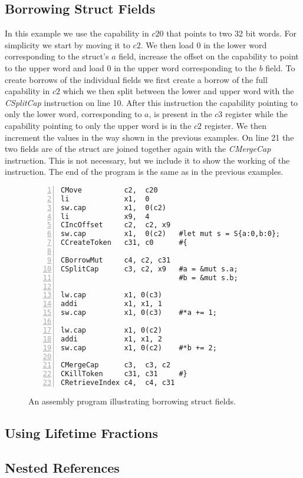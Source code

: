 \subsection{Borrowing Struct Fields}
In this example we use the capability in $c20$ that points to two 32 bit words.
For simplicity we start by moving it to $c2$.
We then load 0 in the lower word corresponding to the struct's $a$ field, increase the offset on the capability to point to the upper word and load 0 in the upper word corresponding to the $b$ field.
To create borrows of the individual fields we first create a borrow of the full capability in $c2$ which we then split between the lower and upper word with the \textit{CSplitCap} instruction on line 10.
After this instruction the capability pointing to only the lower word, corresponding to $a$, is present in the $c3$ register while the capability pointing to only the upper word is in the $c2$ register.
We then increment the values in the way shown in the previous examples.
On line 21 the two fields are of the struct are joined together again with the \textit{CMergeCap} instruction.
This is not necessary, but we include it to show the working of the instruction.
The end of the program is the same as in the previous examples.
\begin{figure}[h]
\begin{lstlisting}[style=custASM, numbers = left ,xleftmargin=1.5em]
CMove          c2,  c20
li             x1,  0
sw.cap         x1,  0(c2)
li             x9,  4
CIncOffset     c2,  c2, x9
sw.cap         x1,  0(c2)   #let mut s = S{a:0,b:0};
CCreateToken   c31, c0      #{

CBorrowMut     c4, c2, c31
CSplitCap      c3, c2, x9   #a = &mut s.a;
                            #b = &mut s.b;

lw.cap         x1, 0(c3)
addi           x1, x1, 1
sw.cap         x1, 0(c3)    #*a += 1;

lw.cap         x1, 0(c2)
addi           x1, x1, 2
sw.cap         x1, 0(c2)    #*b += 2;

CMergeCap      c3,  c3, c2
CKillToken     c31, c31     #}
CRetrieveIndex c4,  c4, c31
\end{lstlisting}
\caption{An assembly program illustrating borrowing struct fields.}
\label{fig:asmstructexample}
\end{figure}

\subsection{Using Lifetime Fractions}

\subsection{Nested References}
